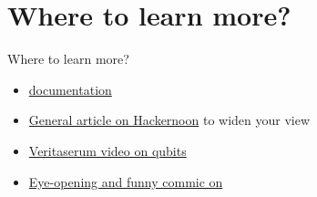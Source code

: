 \documentclass[aspectratio=43]{beamer}
\begin{document}


\section{Where to learn more?}
\begin{frame}{Where to learn more?}
\begin{card}
    \begin{itemize}
    \item \href{https://github.com/Qiskit/openqasm/blob/master/spec/qasm2.rst}{\qasm documentation}
    \item \href{https://hackernoon.com/quantum-computing-explained-a114999299ca}{General article on Hackernoon} to widen your view
    \item \href{https://www.youtube.com/watch?v=g_IaVepNDT4}{Veritaserum video on qubits}
    \item \href{http://www.smbc-comics.com/comic/the-talk-3}{Eye-opening and funny commic on \qc}
    \end{itemize}
\end{card}
\end{frame}
\end{document}
